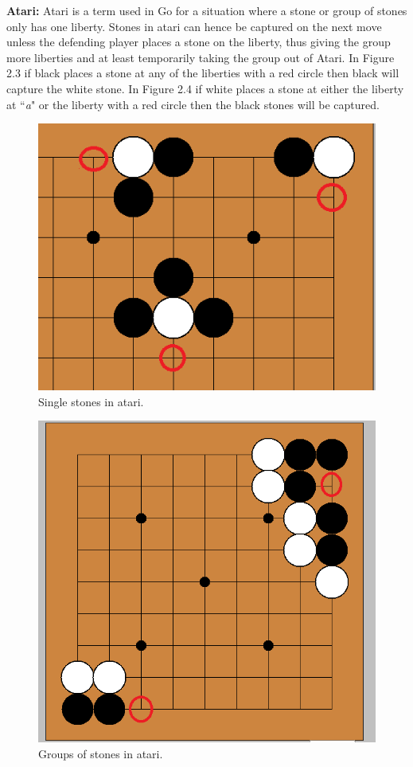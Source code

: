 \documentclass{l3proj}
\begin{document}
\textbf{Atari:} Atari is a term used in Go for a situation where a stone or group of stones only has one liberty. Stones in atari can hence be captured on the next move unless the defending player places a stone on the liberty, thus giving the group more liberties and at least temporarily taking the group out of Atari. In Figure 2.3  if black places a stone at any of the liberties with a red circle then black will capture the white stone. In Figure 2.4 if white places a stone at either the liberty at “\textit{a}" or the liberty with a red circle then the black stones will be captured.

\begin{figure}[H]
\centering
\includegraphics[scale=0.5]{Images/singlestonesinatari.png}
\caption{Single stones in atari.}
\end{figure}

\begin{figure}[H]
\centering
\includegraphics[scale=0.5]{Images/groupsofstonesinatari.png}
\caption{Groups of stones in atari.}
\end{figure}
\end{document}

